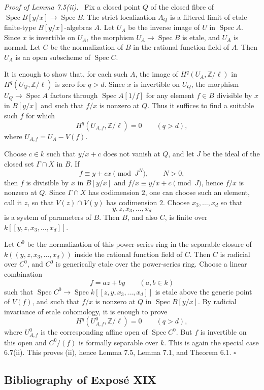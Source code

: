 \documentclass[12pt]{article}
\newcommand{\ZZ}{\mathbb Z}
\DeclareMathOperator{\Spec}{Spec}
\newcommand{\qedtext}{\hfill\(\square\)}
\newenvironment{prooftext}[1][Proof]{\par\noindent\emph{#1.}\ }{\par\medskip}
\begin{document}
\begin{prooftext}[Proof of Lemma 7.5(ii)]
Fix a closed point $Q$ of the closed fibre of $\Spec B[y/x]\to\Spec B$. The strict localization $A_Q$ is a filtered limit of etale finite-type $B[y/x]$-algebras $A$. Let $U_A$ be the inverse image of $U$ in $\Spec A$. Since $x$ is invertible on $U_A$, the morphism $U_A\to\Spec B$ is etale, and $U_A$ is normal. Let $C$ be the normalization of $B$ in the rational function field of $A$. Then $U_A$ is an open subscheme of $\Spec C$.

It is enough to show that, for each such $A$, the image of $H^q(U_A,\ZZ/\ell)$ in $H^q(U_Q,\ZZ/\ell)$ is zero for $q>d$. Since $x$ is invertible on $U_Q$, the morphism $U_Q\to\Spec A$ factors through $\Spec A[1/f]$ for any element $f\in B$ divisible by $x$ in $B[y/x]$ and such that $f/x$ is nonzero at $Q$. Thus it suffices to find a suitable such $f$ for which
\[
   H^q(U_{A,f},\ZZ/\ell)=0\qquad(q>d),
\]
where $U_{A,f}=U_A-V(f)$.

Choose $c\in k$ such that $y/x+c$ does not vanish at $Q$, and let $J$ be the ideal of the closed set $\Gamma\cap X$ in $B$. If
\[
   f\equiv y+cx\pmod{J^N},\qquad N>0, \tag{7.8}
\]
then $f$ is divisible by $x$ in $B[y/x]$ and $f/x\equiv y/x+c\pmod J$, hence $f/x$ is nonzero at $Q$. Since $\Gamma\cap X$ has codimension $2$, one can choose such an element, call it $z$, so that $V(z)\cap V(y)$ has codimension $2$. Choose $x_3,\ldots,x_d$ so that
\[
   y,z,x_3,\ldots,x_d
\]
is a system of parameters of $B$. Then $B$, and also $C$, is finite over $k[[y,z,x_3,\ldots,x_d]]$.

Let $C^0$ be the normalization of this power-series ring in the separable closure of $k((y,z,x_3,\ldots,x_d))$ inside the rational function field of $C$. Then $C$ is radicial over $C^0$, and $C^0$ is generically etale over the power-series ring. Choose a linear combination
\[
   f=az+by\qquad(a,b\in k)
\]
such that $\Spec C^0\to\Spec k[[z,y,x_3,
\ldots,x_d]]$ is etale above the generic point of $V(f)$, and such that $f/x$ is nonzero at $Q$ in $\Spec B[y/x]$. By radicial invariance of etale cohomology, it is enough to prove
\[
   H^q(U^0_{A,f},\ZZ/\ell)=0\qquad(q>d),
\]
where $U^0_{A,f}$ is the corresponding affine open of $\Spec C^0$. But $f$ is invertible on this open and $C^0/(f)$ is formally separable over $k$. This is again the special case 6.7(ii). This proves (ii), hence Lemma 7.5, Lemma 7.1, and Theorem 6.1. \qedtext
\end{prooftext}

\subsection*{Bibliography of Expos\'e XIX}
\end{document}
